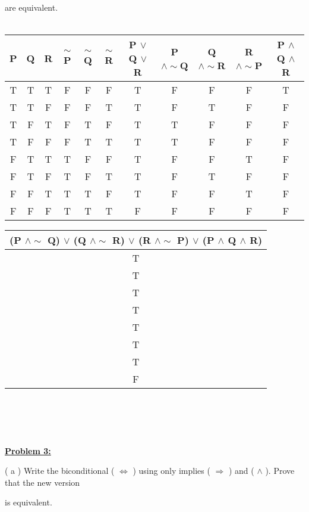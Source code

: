 \documentclass[11pt]{article}
\begin{document}
	are equivalent.
	\\\\
	\begin{tabular}{|c c c c c c !{\color{red}\vrule} c !{\color{red}\vrule} c c c c|} 
	\hline
	P & Q & R & $\sim$P & $\sim$Q & $\sim$R & P $\vee$ Q $\vee$ R & P $\wedge \sim$Q & Q $\wedge \sim$R & R $\wedge \sim$P & P $\wedge$ Q $\wedge$ R \\ [0.5ex] 
 		\hline\hline
	T & T & T & F & F & F & T & F & F & F & T \\
	T & T & F & F & F & T & T & F & T & F & F \\
	T & F & T & F & T & F & T & T & F & F & F \\
	T & F & F & F & T & T & T & T & F & F & F \\
	F & T & T & T & F & F & T & F & F & T & F \\
	F & T & F & T & F & T & T & F & T & F & F \\
	F & F & T & T & T & F & T & F & F & T & F \\
	F & F & F & T & T & T & F & F & F & F & F \\
	\hline
	\end{tabular} 

	\noindent
	\begin{tabular}{|c|}
		\arrayrulecolor{red}\hline
		\hline
		(P $\wedge \sim$ Q) $\vee$ (Q $\wedge \sim$ R) $\vee$ (R $\wedge \sim$ P) $\vee$ (P $\wedge$ Q $\wedge$ R) \\[0.5ex]
		\hline\hline
		T \\
		T \\
		T \\
		T \\
		T \\
		T \\
		T \\
		F \\
		\hline
		\end{tabular}\\\\\\\\


\noindent
	\textbf{\underline{Problem 3:}} 


	( a ) Write the biconditional ( $\Leftrightarrow$ ) using only implies ( $\Rightarrow$ ) and ( $\wedge$ ). Prove that the new version

 	is equivalent.
\end{document}
